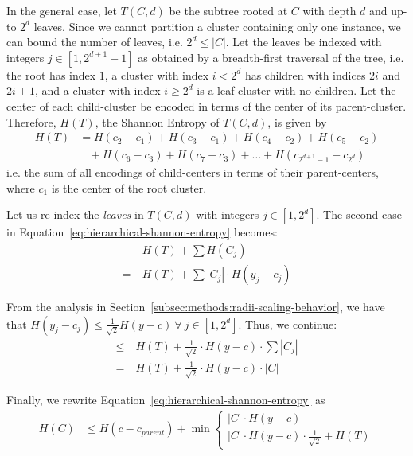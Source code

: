 In the general case, let $T(C, d)$ be the subtree rooted at $C$ with depth $d$ and up-to $2^d$ leaves.
Since we cannot partition a cluster containing only one instance, we can bound the number of leaves, i.e. $2^d \leq |C|$.
Let the leaves be indexed with integers $j \in [1, 2^{d + 1} - 1]$ as obtained by a breadth-first traversal of the tree, i.e. the root has index $1$, a cluster with index $i < 2^d$ has children with indices $2i$ and $2i + 1$, and a cluster with index $i \geq 2^d$ is a leaf-cluster with no children.
Let the center of each child-cluster be encoded in terms of the center of its parent-cluster.
Therefore, $H(T)$, the Shannon Entropy of $T(C, d)$, is given by
\begin{align*}
    H(T) &= H(c_2 - c_1) + H(c_3 - c_1) + H(c_4 - c_2) + H(c_5 - c_2) \\
    & \ \ \ \ + H(c_6 - c_3) + H(c_7 - c_3) + \dots + H(c_{2^{d + 1} - 1} - c_{2^d})
\end{align*}
i.e. the sum of all encodings of child-centers in terms of their parent-centers, where $c_1$ is the center of the root cluster.

Let us re-index the \textit{leaves} in $T(C, d)$ with integers $j \in [1, 2^d]$.
The second case in Equation~\ref{eq:hierarchical-shannon-entropy} becomes:
\begin{align*}
    & H(T) + \sum H(C_j) \\
    = \ & H(T) + \sum |C_j| \cdot H(y_j - c_j)
\end{align*}

From the analysis in Section~\ref{subsec:methods:radii-scaling-behavior}, we have that $H(y_j - c_j) \leq \frac{1}{\sqrt{2}} H(y - c) \ \forall \ j \in [1, 2^d]$.
Thus, we continue:
\begin{align*}
    \leq \ & H(T) + \frac{1}{\sqrt{2}} \cdot H(y - c) \cdot \sum |C_j| \\
    = \ & H(T) + \frac{1}{\sqrt{2}} \cdot H(y - c) \cdot |C|
\end{align*}

Finally, we rewrite Equation~\ref{eq:hierarchical-shannon-entropy} as
\begin{align}
    \label{eq:hierarchical-shannon-entropy-2}
    H(C) &\leq H(c - c_{parent}) + \min \begin{cases}
        |C| \cdot H(y - c) \\
        |C| \cdot H(y - c) \cdot \frac{1}{\sqrt{2}} + H(T)
    \end{cases}
\end{align}

